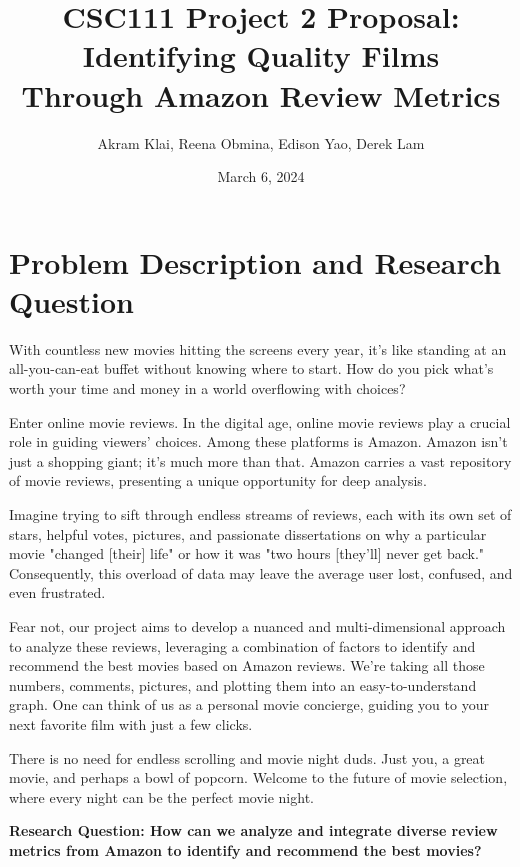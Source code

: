 \documentclass[fontsize=11pt]{article}
\title{CSC111 Project 2 Proposal: Identifying Quality Films \\ Through Amazon Review Metrics}
\author{Akram Klai, Reena Obmina, Edison Yao, Derek Lam}
\date{March 6, 2024}
\begin{document}
\maketitle

\section*{Problem Description and Research Question}

\noindent With countless new movies hitting the screens every year, it's like standing at an all-you-can-eat buffet without knowing where to start. How do you pick what's worth your time and money in a world overflowing with choices?
\vspace{0.5cm}

\noindent Enter online movie reviews. In the digital age, online movie reviews play a crucial role in guiding viewers' choices. Among these platforms is Amazon. Amazon isn't just a shopping giant; it's much more than that. Amazon carries a vast repository of movie reviews, presenting a unique opportunity for deep analysis. 
\vspace{0.5cm}

\noindent Imagine trying to sift through endless streams of reviews, each with its own set of stars, helpful votes, pictures, and passionate dissertations on why a particular movie "changed [their] life" or how it was "two hours [they'll] never get back." Consequently, this overload of data may leave the average user lost, confused, and even frustrated.
\vspace{0.5cm}

\noindent Fear not, our project aims to develop a nuanced and multi-dimensional approach to analyze these reviews, leveraging a combination of factors to identify and recommend the best movies based on Amazon reviews. We're taking all those numbers, comments, pictures, and plotting them into an easy-to-understand graph. One can think of us as a personal movie concierge, guiding you to your next favorite film with just a few clicks.
\vspace{0.5cm}

\noindent There is no need for endless scrolling and movie night duds. Just you, a great movie, and perhaps a bowl of popcorn. Welcome to the future of movie selection, where every night can be the perfect movie night.

\vspace{0.5cm}

\noindent \textbf{Research Question: How can we analyze and integrate diverse review metrics from Amazon to identify and recommend the best movies?}
\end{document}
